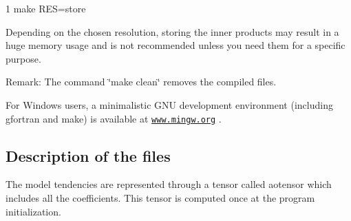 \begin{DoxyCode}
1 make RES=store
\end{DoxyCode}


Depending on the chosen resolution, storing the inner products may result in a huge memory usage and is not recommended unless you need them for a specific purpose.

Remark\+: The command \char`\"{}make clean\char`\"{} removes the compiled files.

For Windows users, a minimalistic G\+NU development environment (including gfortran and make) is available at \href{http://www.mingw.org}{\tt www.\+mingw.\+org} . 



\subsection*{Description of the files}

The model tendencies are represented through a tensor called aotensor which includes all the coefficients. This tensor is computed once at the program initialization.


